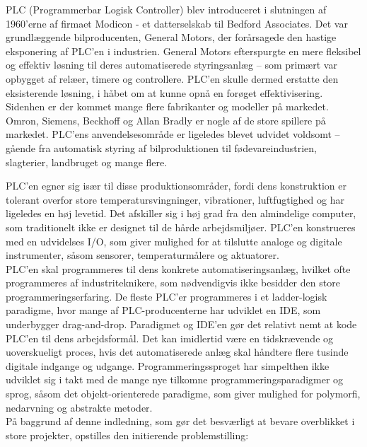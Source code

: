 PLC (Programmerbar Logisk Controller) blev introduceret i slutningen af 1960’erne af firmaet Modicon - et datterselskab til Bedford Associates. Det var grundlæggende bilproducenten, General Motors, der forårsagede den hastige eksponering af PLC’en i industrien. General Motors efterspurgte en mere fleksibel og effektiv løsning til deres automatiserede styringsanlæg – som primært var opbygget af relæer, timere og controllere. PLC’en skulle dermed erstatte den eksisterende løsning, i håbet om at kunne opnå en forøget effektivisering. \\

\noindent Sidenhen er der kommet mange flere fabrikanter og modeller på markedet. Omron, Siemens, Beckhoff og Allan Bradly er nogle af de store spillere på markedet. PLC’ens anvendelsesområde er ligeledes blevet udvidet voldsomt – gående fra automatisk styring af bilproduktionen til fødevareindustrien, slagterier, landbruget og mange flere. 

\noindent PLC’en egner sig især til disse produktionsområder, fordi dens konstruktion er tolerant overfor store temperatursvingninger, vibrationer, luftfugtighed og har ligeledes en høj levetid. Det afskiller sig i høj grad fra den almindelige computer, som traditionelt ikke er designet til de hårde arbejdsmiljøer. PLC’en konstrueres med en udvidelses I/O, som giver mulighed for at tilslutte analoge og digitale instrumenter, såsom sensorer, temperaturmålere og aktuatorer. \\

\noindent PLC’en skal programmeres til dens konkrete automatiseringsanlæg, hvilket ofte programmeres af industriteknikere, som nødvendigvis ikke besidder den store programmeringserfaring. De fleste PLC’er programmeres i et ladder-logisk paradigme, hvor mange af PLC-producenterne har udviklet en IDE, som underbygger drag-and-drop. Paradigmet og IDE’en gør det relativt nemt at kode PLC’en til dens arbejdsformål. Det kan imidlertid være en tidskrævende og uoverskueligt proces, hvis det automatiserede anlæg skal håndtere flere tusinde digitale indgange og udgange. Programmeringssproget har simpelthen ikke udviklet sig i takt med de mange nye tilkomne programmeringsparadigmer og sprog, såsom det objekt-orienterede paradigme, som giver mulighed for polymorfi, nedarvning og abstrakte metoder. \\

\noindent På baggrund af denne indledning, som gør det besværligt at bevare overblikket i store projekter, opstilles den initierende problemstilling: \\

